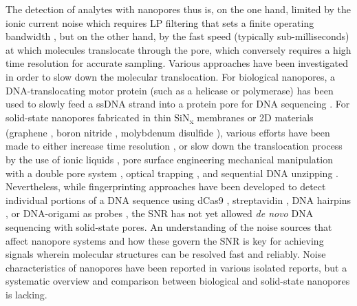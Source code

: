  \noindent The detection of analytes with nanopores thus is, on the one hand, limited by the ionic current noise which requires LP filtering that sets a finite operating bandwidth \cite{Storm2005,Plesa2013}, but on the other hand, by the fast speed (typically sub-milliseconds) at which molecules translocate through the pore, which conversely requires a high time resolution for accurate sampling. Various approaches have been investigated in order to slow down the molecular translocation. For biological nanopores, a DNA-translocating motor protein (such as a helicase or polymerase) has been used to slowly feed a ssDNA strand into a protein pore for DNA sequencing \cite{Manrao2012,Derrington2010,Carter2018}. For solid-state nanopores fabricated in thin SiN\textsubscript{x} membranes \cite{Balan2014,Balan2015,Venta2013} or 2D materials (graphene \cite{Merchant2010,Schneider2010,Schneider2013}, boron nitride \cite{Zhou2013,Park2016,Liu2017}, molybdenum disulfide \cite{Graf2019,Liu2014,Feng2015}), various efforts have been made to either increase time resolution \cite{Balan2014,Balan2015,Rosenstein2012,Venta2013,Shekar2016,Thiel2019}, or slow down the translocation process \cite{Keyser2011} by the use of ionic liquids \cite{Feng2015}, pore surface engineering \cite{Wanunu2007} mechanical manipulation with a double pore system \cite{Pud2016}, optical trapping \cite{Gilboa2015}, and sequential DNA unzipping \cite{Yamazaki2018}. Nevertheless, while fingerprinting approaches have been developed to detect individual portions of a DNA sequence using dCas9 \cite{Yang2018,Weckman2019}, streptavidin \cite{Chen2017}, DNA hairpins \cite{Chen2019}, or DNA-origami as probes \cite{Bell2016}, the SNR has not yet allowed \emph{de novo} DNA sequencing with solid-state pores. An understanding of the noise sources that affect nanopore systems and how these govern the SNR is key for achieving signals wherein molecular structures can be resolved fast and reliably. Noise characteristics of nanopores have been reported in various isolated reports, but a systematic overview and comparison between biological and solid-state nanopores is lacking. 


